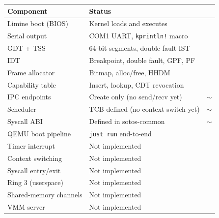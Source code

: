\documentclass[11pt,a4paper]{article}
\newcommand{\cmark}{\ding{51}}
\newcommand{\xmark}{\ding{55}}
\begin{document}
\begin{center}
\begin{tabularx}{\textwidth}{lXc}
\toprule
\textbf{Component} & \textbf{Status} & \textbf{} \\
\midrule
Limine boot (BIOS)         & Kernel loads and executes           & \textcolor{green!60!black}{\cmark} \\
Serial output              & COM1 UART, \texttt{kprintln!} macro & \textcolor{green!60!black}{\cmark} \\
GDT + TSS                  & 64-bit segments, double fault IST   & \textcolor{green!60!black}{\cmark} \\
IDT                        & Breakpoint, double fault, GPF, PF   & \textcolor{green!60!black}{\cmark} \\
Frame allocator            & Bitmap, alloc/free, HHDM            & \textcolor{green!60!black}{\cmark} \\
Capability table           & Insert, lookup, CDT revocation      & \textcolor{green!60!black}{\cmark} \\
IPC endpoints              & Create only (no send/recv yet)       & \textcolor{yellow!60!black}{$\sim$} \\
Scheduler                  & TCB defined (no context switch yet) & \textcolor{yellow!60!black}{$\sim$} \\
Syscall ABI                & Defined in sotos-common             & \textcolor{yellow!60!black}{$\sim$} \\
QEMU boot pipeline         & \texttt{just run} end-to-end        & \textcolor{green!60!black}{\cmark} \\
\midrule
Timer interrupt            & Not implemented                     & \textcolor{red!60}{\xmark} \\
Context switching          & Not implemented                     & \textcolor{red!60}{\xmark} \\
Syscall entry/exit         & Not implemented                     & \textcolor{red!60}{\xmark} \\
Ring 3 (userspace)         & Not implemented                     & \textcolor{red!60}{\xmark} \\
Shared-memory channels     & Not implemented                     & \textcolor{red!60}{\xmark} \\
VMM server                 & Not implemented                     & \textcolor{red!60}{\xmark} \\
\bottomrule
\end{tabularx}
\end{center}
\end{document}
